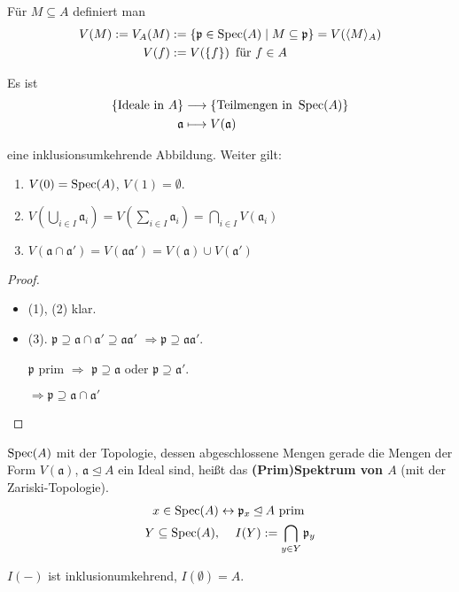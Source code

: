 Für $M\subseteq A$ definiert man
\begin{align*}
  V(M) := V_{A}(M) & :=\{\mathfrak{p}\in\operatorname{Spec}(A)\mid M \subseteq \mathfrak{p} \}=V(\langle M\rangle_{A})\\
  V(f) & :=V(\{f\})\text{\, für }f\in A
\end{align*}

\begin{lem}
\label{lem:zariski-top-auf-spektrum}
Es ist
  \begin{align*}
    \{\text{Ideale in }A\} & \longrightarrow\text{\{Teilmengen in }\operatorname{Spec}(A)\}\\
    \mathfrak{a} & \longmapsto V(\mathfrak{a})
  \end{align*}

  eine inklusionsumkehrende Abbildung. Weiter gilt:
  \begin{enumerate}
  \item $V(0)=\operatorname{Spec}(A)$, $V(1)=\emptyset$.
  \item $V\left(\bigcup_{i\in
        I}\mathfrak{a}_{i}\right)=V\left(\sum_{i\in
        I}\mathfrak{a}_{i}\right)=\bigcap_{i\in I}V(\mathfrak{a}_{i})$
  \item
    $V(\mathfrak{a}\cap\mathfrak{a}')=V(\mathfrak{a}\mathfrak{a}')=V(\mathfrak{a})\cup
    V(\mathfrak{a}')$
  \end{enumerate}
\end{lem}
\begin{proof} \mbox{}
  \begin{itemize}
  \item (1), (2) klar.
  \item
    (3). $\mathfrak{p}\supseteq\mathfrak{a}\cap\mathfrak{a}'\supseteq\mathfrak{a}\mathfrak{a}'$ $\Rightarrow\mathfrak{p}\supseteq\mathfrak{a}\mathfrak{a}'$.

    $\mathfrak{p}$ prim $\Rightarrow$ $\mathfrak{p}\supseteq\mathfrak{a}$ oder
    $\mathfrak{p}\supseteq\mathfrak{a}'$.

    $\Rightarrow\mathfrak{p}\supseteq\mathfrak{a}\cap\mathfrak{a}'$

  \end{itemize}
\end{proof}
\begin{defn}
\label{def:spec-als-top-raum}
$\operatorname{Spec}(A)$ mit der Topologie, dessen abgeschlossene Mengen
  gerade die Mengen der Form $V(\mathfrak{a})$,
  $\mathfrak{a}\unlhd A$ ein Ideal sind, heißt das \textbf{(Prim)Spektrum von $A$}
  (mit der Zariski-Topologie).
  \begin{align*}
    x\in\operatorname{Spec}(A) & \leftrightarrow\mathfrak{p}_{x}\unlhd A\text{ prim}\\
    Y\subseteq\operatorname{Spec}(A), & \phantom{\leftrightarrow\
                              }I(Y):=\bigcap_{y \in Y}\mathfrak{p}_{y}
  \end{align*}

  $I(-)$ ist inklusionumkehrend, $I(\emptyset)=A$.
\end{defn}
